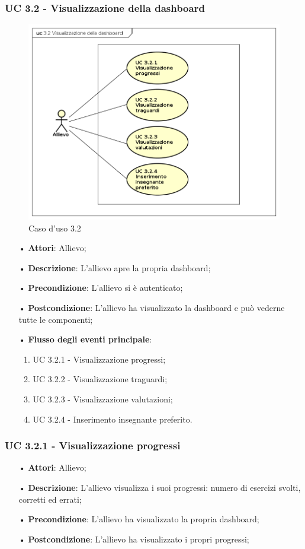 \subsubsection{UC 3.2 - Visualizzazione della {dashboard}}
\begin{figure}[H]
\centering
\includegraphics[width=17cm]{img/UC32.png} 
\caption{Caso d'uso 3.2}\label{fig:32}
\end{figure}
\begin{itemize}
\item[•]\textbf{Attori}: Allievo;
\item[•]\textbf{Descrizione}: L'allievo apre la propria {dashboard};
\item[•]\textbf{Precondizione}: L'allievo si è autenticato;
\item[•]\textbf{Postcondizione}: L'allievo ha visualizzato la {dashboard} e può vederne tutte le componenti;
\item[•]\textbf{Flusso degli eventi principale}:
\begin{enumerate}
\item UC 3.2.1 - Visualizzazione progressi;
\item UC 3.2.2 - Visualizzazione traguardi;
\item UC 3.2.3 - Visualizzazione valutazioni;
\item UC 3.2.4 - Inserimento insegnante preferito.
\end{enumerate}
\end{itemize}

\subsubsection{UC 3.2.1 - Visualizzazione progressi}
\begin{itemize}
\item[•]\textbf{Attori}: Allievo;
\item[•]\textbf{Descrizione}: L'allievo visualizza i suoi progressi: numero di esercizi svolti, corretti ed errati;
\item[•]\textbf{Precondizione}: L'allievo ha visualizzato la propria {dashboard};
\item[•]\textbf{Postcondizione}: L'allievo ha visualizzato i propri progressi;
\end{itemize}

